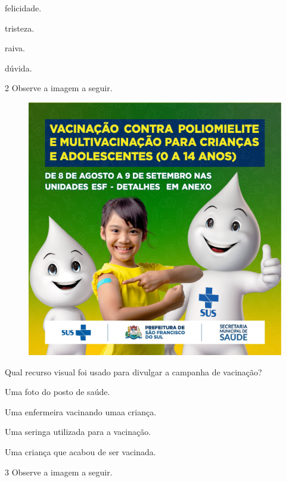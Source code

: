 \begin{escolha}
\item felicidade.

\item tristeza.

\item raiva.

\item dúvida.
\end{escolha}

\pagebreak
\num{2} Observe a imagem a seguir.

\begin{figure}[H]
\centering
\includegraphics[width=.7\textwidth]{media/image208.jpg}
\end{figure}

Qual recurso visual foi usado para divulgar a campanha de vacinação?

\begin{escolha}
\item Uma foto do posto de saúde.

\item Uma enfermeira vacinando umaa criança.

\item Uma seringa utilizada para a vacinação.

\item Uma criança que acabou de ser vacinada.
\end{escolha}

\pagebreak
\num{3} Observe a imagem a seguir.

